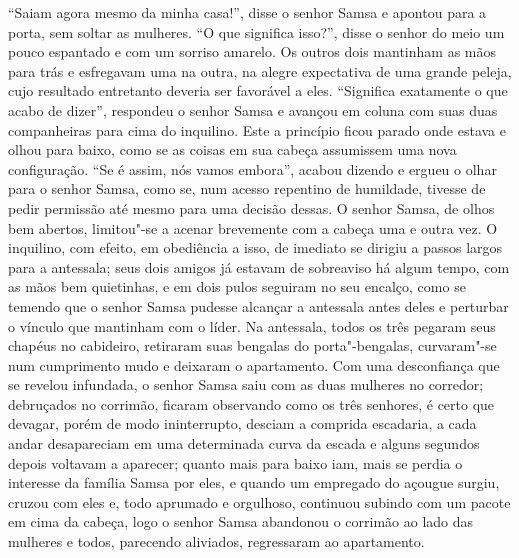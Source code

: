 “Saiam agora mesmo da minha casa!”, disse o senhor Samsa e apontou para a
porta, sem soltar as mulheres. “O que significa isso?”, disse o senhor do
meio um pouco espantado e com um sorriso amarelo. Os outros dois mantinham
as mãos para trás e esfregavam uma na outra, na alegre expectativa de uma
grande peleja, cujo resultado entretanto deveria ser favorável a eles.
“Significa exatamente o que acabo de dizer”, respondeu o senhor Samsa e
avançou em coluna com suas duas companheiras para cima do inquilino. Este
a princípio ficou parado onde estava e olhou para baixo, como se as coisas
em sua cabeça assumissem uma nova configuração. “Se é assim, nós vamos
embora”, acabou dizendo e ergueu o olhar para o senhor Samsa, como se, num
acesso repentino de humildade, tivesse de pedir permissão até mesmo para
uma decisão dessas. O senhor Samsa, de olhos bem abertos, limitou"-se a
acenar brevemente com a cabeça uma e outra vez. O inquilino, com efeito,
em obediência a isso, de imediato se dirigiu a passos largos para a
antessala; seus dois amigos já estavam de sobreaviso há algum tempo, com
as mãos bem quietinhas, e em dois pulos seguiram no seu encalço, como se
temendo que o senhor Samsa pudesse alcançar a antessala antes deles e
perturbar o vínculo que mantinham com o líder. Na antessala, todos os três
pegaram seus chapéus no cabideiro, retiraram suas bengalas do
porta"-bengalas, curvaram"-se num cumprimento mudo e deixaram o apartamento.
Com uma desconfiança que se revelou infundada, o senhor Samsa saiu com as
duas mulheres no corredor; debruçados no corrimão, ficaram observando como
os três senhores, é certo que devagar, porém de modo ininterrupto, desciam
a comprida escadaria, a cada andar desapareciam em uma determinada curva
da escada e alguns segundos depois voltavam a aparecer; quanto mais para
baixo iam, mais se perdia o interesse da família Samsa por eles, e quando
um empregado do açougue surgiu, cruzou com eles e, todo aprumado e
orgulhoso, continuou subindo com um pacote em cima da cabeça, logo o
senhor Samsa abandonou o corrimão ao lado das mulheres e todos, parecendo
aliviados, regressaram ao apartamento.

